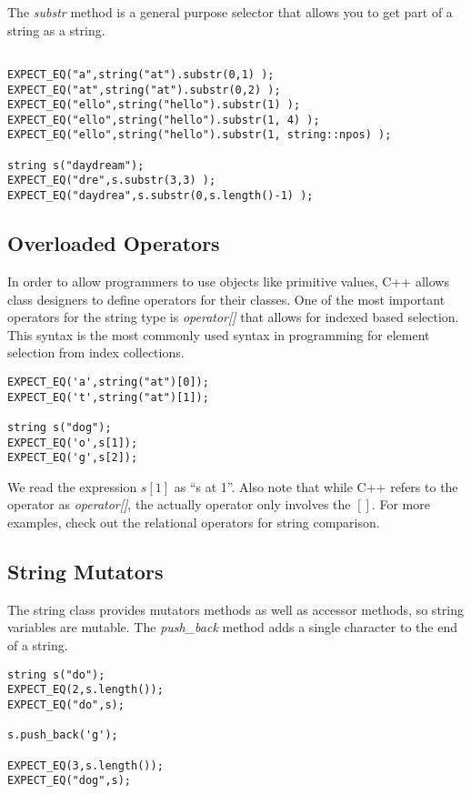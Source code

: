 \documentclass[]{tufte-handout}
\begin{document}
The \textit{substr} method is a general purpose selector that allows you to get part of a string as a string. 
\begin{verbatim}

EXPECT_EQ("a",string("at").substr(0,1) );
EXPECT_EQ("at",string("at").substr(0,2) );
EXPECT_EQ("ello",string("hello").substr(1) );
EXPECT_EQ("ello",string("hello").substr(1, 4) );
EXPECT_EQ("ello",string("hello").substr(1, string::npos) );

string s("daydream");
EXPECT_EQ("dre",s.substr(3,3) );
EXPECT_EQ("daydrea",s.substr(0,s.length()-1) );

\end{verbatim}

\subsection{Overloaded Operators}

In order to allow programmers to use objects like primitive values, C++ allows class designers to define operators for their classes. One of the most important operators for the string type is \textit{operator[]} that allows for indexed based selection. This syntax is the most commonly used syntax in programming for element selection from index collections.
\begin{verbatim}
EXPECT_EQ('a',string("at")[0]);
EXPECT_EQ('t',string("at")[1]);

string s("dog");
EXPECT_EQ('o',s[1]);
EXPECT_EQ('g',s[2]);
\end{verbatim}
We read the expression $s[1]$ as ``s at 1''. Also note that while C++ refers to the operator as \textit{operator[]}, the actually operator only involves the $[]$. For more examples, check out the relational operators for string comparison.

\subsection{String Mutators}

The string class provides mutators methods as well as accessor methods, so string variables are mutable. The \textit{push\_back} method adds a single character to the end of a string.
\begin{verbatim}
string s("do");
EXPECT_EQ(2,s.length());
EXPECT_EQ("do",s);

s.push_back('g');

EXPECT_EQ(3,s.length());
EXPECT_EQ("dog",s);
\end{verbatim}
\end{document}

